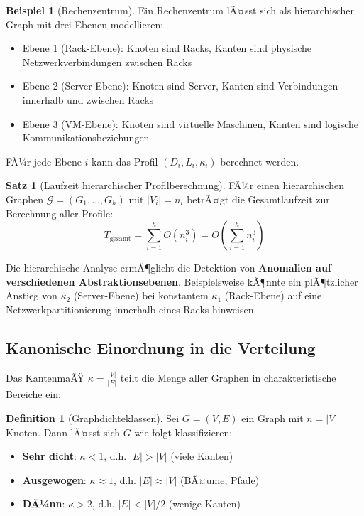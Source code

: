 ﻿\documentclass[a4paper,12pt]{article}
\theoremstyle{definition}
\newtheorem{definition}{Definition}
\newtheorem{beispiel}{Beispiel}
\newtheorem{satz}{Satz}
\begin{document}
	\begin{beispiel}[Rechenzentrum]
		Ein Rechenzentrum lÃ¤sst sich als hierarchischer Graph mit drei Ebenen modellieren:
		\begin{itemize}
			\item[-] Ebene 1 (Rack-Ebene): Knoten sind Racks, Kanten sind physische Netzwerkverbindungen zwischen Racks
			\item[-] Ebene 2 (Server-Ebene): Knoten sind Server, Kanten sind Verbindungen innerhalb und zwischen Racks
			\item[-] Ebene 3 (VM-Ebene): Knoten sind virtuelle Maschinen, Kanten sind logische Kommunikationsbeziehungen
		\end{itemize}
		FÃ¼r jede Ebene $i$ kann das Profil $(D_i, L_i, \kappa_i)$ berechnet werden.
	\end{beispiel}
	
	\begin{satz}[Laufzeit hierarchischer Profilberechnung]
		FÃ¼r einen hierarchischen Graphen $\mathcal{G} = (G_1, \ldots, G_h)$ mit $|V_i| = n_i$ betrÃ¤gt die Gesamtlaufzeit zur Berechnung aller Profile:
		\[
		T_{\text{gesamt}} = \sum_{i=1}^{h} O(n_i^3) = O\left(\sum_{i=1}^{h} n_i^3\right)
		\]
	\end{satz}
	
	Die hierarchische Analyse ermÃ¶glicht die Detektion von \textbf{Anomalien auf verschiedenen Abstraktionsebenen}. Beispielsweise kÃ¶nnte ein plÃ¶tzlicher Anstieg von $\kappa_2$ (Server-Ebene) bei konstantem $\kappa_1$ (Rack-Ebene) auf eine Netzwerkpartitionierung innerhalb eines Racks hinweisen.
	
	\subsection{Kanonische Einordnung in die Verteilung}
	
	Das KantenmaÃŸ $\kappa = \frac{|V|}{|E|}$ teilt die Menge aller Graphen in charakteristische Bereiche ein:
	
	\begin{definition}[Graphdichteklassen]
		Sei $G = (V,E)$ ein Graph mit $n = |V|$ Knoten. Dann lÃ¤sst sich $G$ wie folgt klassifizieren:
		\begin{itemize}
			\item[-] \textbf{Sehr dicht}: $\kappa < 1$, d.h. $|E| > |V|$ (viele Kanten)
			\item[-] \textbf{Ausgewogen}: $\kappa \approx 1$, d.h. $|E| \approx |V|$ (BÃ¤ume, Pfade)
			\item[-] \textbf{DÃ¼nn}: $\kappa > 2$, d.h. $|E| < |V|/2$ (wenige Kanten)
		\end{itemize}
	\end{definition}
	
\end{document}
